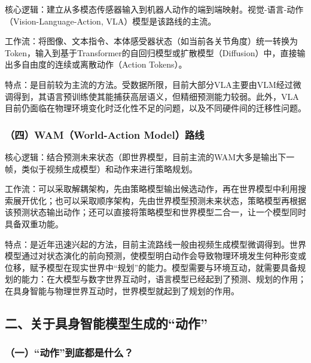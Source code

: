 核心逻辑：建立从多模态传感器输入到机器人动作的端到端映射。视觉-语言-动作（Vision-Language-Action, VLA）模型是该路线的主流。

工作流：将图像、文本指令、本体感受器状态（如当前各关节角度）统一转换为Token，输入到基于Transformer的自回归模型或扩散模型（Diffusion）中，直接输出多自由度的连续或离散动作（Action Tokens）。

特点：是目前较为主流的方法。受数据所限，目前大部分VLA主要由VLM经过微调得到，其语言预训练使其能捕获高层语义，但精细预测能力较弱。此外，VLA目前仍面临在物理环境变化时泛化性不足的问题，以及不同硬件间的迁移性问题。

\hypertarget{ux56dbwamworld-action-modelux8defux7ebf}{%
\subsubsection{（四）WAM（World-Action Model）路线}\label{ux56dbwamworld-action-modelux8defux7ebf}}

核心逻辑：结合预测未来状态（即世界模型，目前主流的WAM大多是输出下一帧，类似于视频生成模型）和动作来进行策略规划。

工作流：可以采取解耦架构，先由策略模型输出候选动作，再在世界模型中利用搜索展开优化；也可以采取顺序架构，先由世界模型预测未来状态，策略模型再根据该预测状态输出动作；还可以直接将策略模型和世界模型二合一，让一个模型同时具备双重功能。

特点：是近年迅速兴起的方法，目前主流路线一般由视频生成模型微调得到。世界模型通过对状态演化的前向预测，使模型明白动作会导致物理环境发生何种形变或位移，赋予模型在现实世界中``规划''的能力。模型需要与环境互动，就需要具备规划的能力：在大模型与数字世界互动时，语言模型已经起到了预测、规划的作用；在具身智能与物理世界互动时，世界模型就起到了规划的作用。

\hypertarget{ux4e8cux5173ux4e8eux5177ux8eabux667aux80fdux6a21ux578bux751fux6210ux7684ux52a8ux4f5c}{%
\subsection{二、关于具身智能模型生成的``动作''}\label{ux4e8cux5173ux4e8eux5177ux8eabux667aux80fdux6a21ux578bux751fux6210ux7684ux52a8ux4f5c}}

\hypertarget{ux4e00ux52a8ux4f5cux5230ux5e95ux90fdux662fux4ec0ux4e48}{%
\subsubsection{（一）``动作''到底都是什么？}\label{ux4e00ux52a8ux4f5cux5230ux5e95ux90fdux662fux4ec0ux4e48}}

